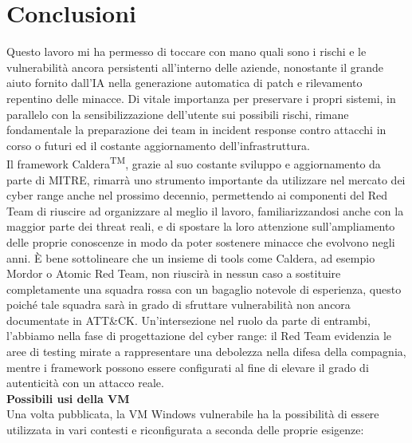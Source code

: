 \chapter{Conclusioni}
Questo lavoro mi ha permesso di toccare con mano quali sono i rischi e le vulnerabilità ancora persistenti all'interno delle aziende, nonostante il grande aiuto fornito dall'IA nella generazione automatica di patch e rilevamento repentino delle minacce. Di vitale importanza per preservare i propri sistemi, in parallelo con la sensibilizzazione dell'utente sui possibili rischi, rimane fondamentale la preparazione dei team in incident response contro attacchi in corso o futuri ed il costante aggiornamento dell'infrastruttura.\\
Il framework Caldera\textsuperscript{TM}, grazie al suo costante sviluppo e aggiornamento da parte di MITRE, rimarrà uno strumento importante da utilizzare nel mercato dei cyber range anche nel prossimo decennio, permettendo ai componenti del Red Team di riuscire ad organizzare al meglio il lavoro, familiarizzandosi anche con la maggior parte dei threat reali, e di spostare la loro attenzione sull'ampliamento delle proprie conoscenze in modo da poter sostenere minacce che evolvono negli anni. È bene sottolineare che un insieme di tools come Caldera, ad esempio Mordor o Atomic Red Team, non riuscirà in nessun caso a sostituire completamente una squadra rossa con un bagaglio notevole di esperienza, questo poiché tale squadra sarà in grado di sfruttare vulnerabilità non ancora documentate in ATT\&CK. Un'intersezione nel ruolo da parte di entrambi, l'abbiamo nella fase di progettazione del cyber range: il Red Team evidenzia le aree di testing mirate a rappresentare una debolezza nella difesa della compagnia, mentre i framework possono essere configurati al fine di elevare il grado di autenticità con un attacco reale.\\[2em]
{\bfseries\Large{Possibili usi della VM}}\\[1.5em]
Una volta pubblicata, la VM Windows vulnerabile ha la possibilità di essere utilizzata in vari contesti e riconfigurata a seconda delle proprie esigenze:
